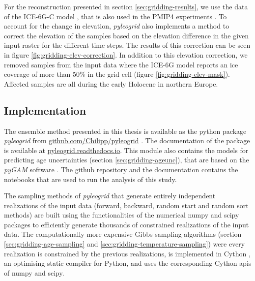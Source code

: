 \documentclass[
11pt, %
english, %
singlespacing, %
headsepline, %
]{MastersDoctoralThesis} %
\begin{document}
\begin{NoHyper}
\begin{refsection}
For the reconstruction presented in section \ref{sec:gridding-results}, we use the data of the ICE-6G-C model \citep{ArgusPeltierDrummondEtAl2014, PeltierArgusDrummond2015}, that is also used in the PMIP4 experiments \citep{IvanovicGregoireKageyamaEtAl2016, Otto-BliesnerBraconnotHarrisonEtAl2017, KageyamaBraconnotHarrisonEtAl2018}. To account for the change in elevation, \textit{pyleogrid} also implements a method to correct the elevation of the samples based on the elevation difference in the given input raster for the different time steps. The results of this correction can be seen in figure \ref{fig:gridding-elev-correction}. In addition to this elevation correction, we removed samples from the input data where the ICE-6G model reports an ice coverage of more than 50\% in the grid cell (figure \ref{fig:gridding-elev-mask}). Affected samples are all during the early Holocene in northern Europe.

\subsection{Implementation}  \label{sec:gridding-package}
The ensemble method presented in this thesis is available as the python package \textit{pyleogrid} from \href{https://github.com/Chilipp/pyleogrid}{github.com/Chilipp/pyleogrid} . The documentation of the package is available at \href{https://pyleogrid.readthedocs.io}{pyleogrid.readthedocs.io}. This module also contains the models for predicting age uncertainties (section \ref{sec:gridding-ageunc}), that are based on the \textit{pyGAM} software \citep{ServenBrummittAbedi2018}. The github repository and the documentation contains the notebooks that are used to run the analysis of this study.

The sampling methods of \textit{pyleogrid} that generate entirely independent realizations of the input data (forward, backward, random start and random sort methods) are built using the functionalities of the numerical numpy and scipy packages \citep{Oliphant2006, JonesOliphantPetersonEtAl2001} to efficiently generate thousands of constrained realizations of the input data. The computationally more expensive Gibbs sampling algorithms (section \ref{sec:gridding-age-sampling} and \ref{sec:gridding-temperature-sampling}) were every realization is constrained by the previous realizations, is implemented in Cython \citep{BehnelBradshawCitroEtAl2011}, an optimising static compiler for Python, and uses the corresponding Cython \glspl{api} of numpy and scipy.


\end{refsection}
\end{NoHyper}
\end{document}
